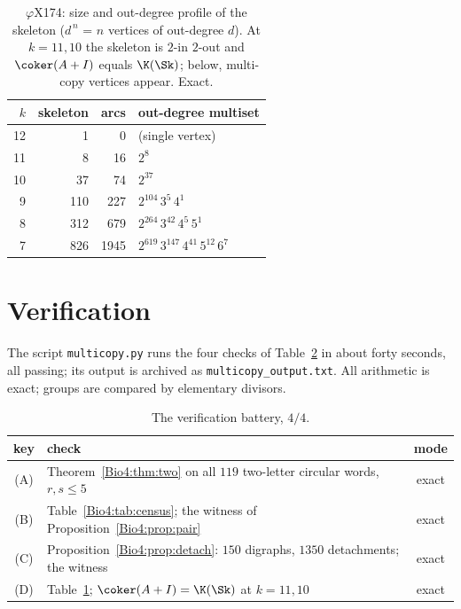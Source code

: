 \begin{table}[ht]
\centering\small
\begin{tabular}{rrrl}
\toprule
$k$ & skeleton & arcs & out-degree multiset\\
\midrule
12 &   1 &    0 & (single vertex)\\
11 &   8 &   16 & $2^{8}$\\
10 &  37 &   74 & $2^{37}$\\
 9 & 110 &  227 & $2^{104}\,3^{5}\,4^{1}$\\
 8 & 312 &  679 & $2^{264}\,3^{42}\,4^{5}\,5^{1}$\\
 7 & 826 & 1945 & $2^{619}\,3^{147}\,4^{41}\,5^{12}\,6^{7}$\\
\bottomrule
\end{tabular}
\caption{$\varphi$X174: size and out-degree profile of the skeleton ($d^{\,n}$ = $n$
vertices of out-degree $d$). At $k=11,10$ the skeleton is $2$-in $2$-out and
$\coker(A+I)$ equals $\K(\Sk)$; below, multi-copy vertices appear. Exact.}
\label{Bio4:tab:phix}
\end{table}

\section{Verification}\label{Bio4:sec:battery}

The script \texttt{multicopy.py} runs the four checks of Table~\ref{Bio4:tab:battery} in
about forty seconds, all passing; its output is archived as
\texttt{multicopy\_output.txt}. All arithmetic is exact; groups are compared by
elementary divisors.

\begin{table}[ht]
\centering\small
\begin{tabular}{clc}
\toprule
key & check & mode\\
\midrule
(A) & Theorem~\ref{Bio4:thm:two} on all $119$ two-letter circular words, $r,s\le5$ & exact\\
(B) & Table~\ref{Bio4:tab:census}; the witness of Proposition~\ref{Bio4:prop:pair} & exact\\
(C) & Proposition~\ref{Bio4:prop:detach}: $150$ digraphs, $1350$ detachments; the witness & exact\\
(D) & Table~\ref{Bio4:tab:phix}; $\coker(A+I)=\K(\Sk)$ at $k=11,10$ & exact\\
\bottomrule
\end{tabular}
\caption{The verification battery, $4/4$.}
\label{Bio4:tab:battery}
\end{table}

